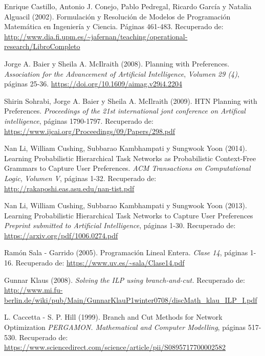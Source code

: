 \documentclass[a4paper]{article}
\begin{document}
\begin{thebibliography}{X}
Enrique Castillo, Antonio J. Conejo, Pablo Pedregal, Ricardo García y Natalia Alguacil (2002). Formulación y Resolución de Modelos de Programación Matemática en Ingeniería y Ciencia. Páginas 461-483.
Recuperado de: \url{http://www.dia.fi.upm.es/~jafernan/teaching/operational-research/LibroCompleto}


Jorge A. Baier y Sheila A. McIlraith (2008). Planning with Preferences. \textit{Association for the Advancement of Artificial Intelligence}, \textit{Volumen 29 (4)}, páginas 25-36.
\url{https://doi.org/10.1609/aimag.v29i4.2204}


Shirin Sohrabi, Jorge A. Baier y Sheila A. McIlraith (2009). HTN Planning with Preferences. \textit{Proceedings of the 21st international jont conference on Artifical intelligence},  páginas 1790-1797.
Recuperado de: \url{https://www.ijcai.org/Proceedings/09/Papers/298.pdf}


 Nan Li, William Cushing, Subbarao Kambhampati y Sungwook Yoon (2014). Learning Probabilistic Hierarchical Task Networks as Probabilistic Context-Free Grammars to Capture User Preferences. \textit{ACM Transactions on Computational Logic}, \textit{Volumen V}, páginas 1-32.
Recuperado de: \url{http://rakaposhi.eas.asu.edu/nan-tist.pdf}


 Nan Li, William Cushing, Subbarao Kambhampati y Sungwook Yoon (2013). Learning Probabilistic Hierarchical Task Networks to Capture User Preferences \textit{Preprint submitted to Artificial Intelligence}, páginas 1-30.
Recuperado de: \url{https://arxiv.org/pdf/1006.0274.pdf}


 Ramón Sala - Garrido (2005). Programación Lineal Entera. \textit{Clase 14}, páginas 1-16.
Recuperado de: \url{https://www.uv.es/~sala/Clase14.pdf}


 Gunnar Klaus (2008).  \textit{Solving the ILP using branch-and-cut.}
Recuperado de: \url{http://www.mi.fu-berlin.de/wiki/pub/Main/GunnarKlauP1winter0708/discMath_klau_ILP_I.pdf}


 L. Caccetta - S. P. Hill (1999). Branch and Cut Methods for Network Optimization  \textit{PERGAMON. Mathematical and Computer Modelling}, páginas 517-530.
Recuperado de: \url{https://www.sciencedirect.com/science/article/pii/S0895717700002582}
 


\end{thebibliography}
\end{document}
